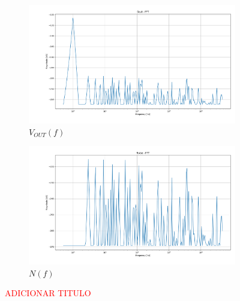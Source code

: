 \begin{figure}[H]
    \begin{subfigure}[b]{0.4\textwidth}
        \centering
        \includegraphics[width=\textwidth]{Images/Dout_ideal.png}
        \caption{$V_{OUT}(f)$}
        \label{fig:Vout_freq_ideal}
    \end{subfigure}%
    \begin{subfigure}[b]{0.4\textwidth}
        \centering
        \includegraphics[width=\textwidth]{Images/Noise_Ideal.png}
        \caption{$N(f)$}
        \label{fig:Noise_freq_ideal}
    \end{subfigure}

    \caption{\textcolor{red}{ADICIONAR TITULO}}
    \label{fig:Noise Ideal}
\end{figure}




